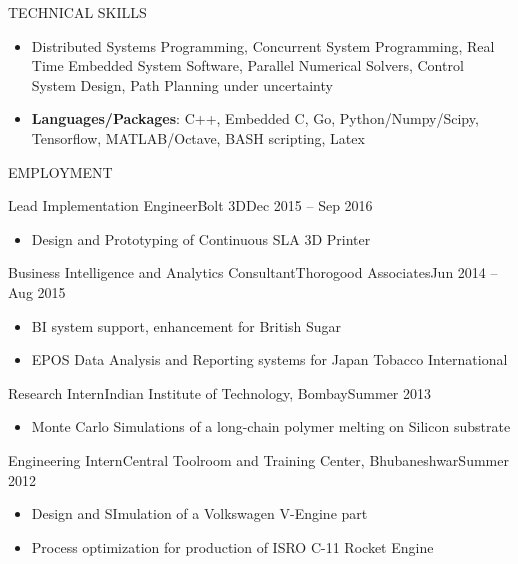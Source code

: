 \documentclass[]{mcdowellcv}
\begin{document}
\makeheader

\begin{cvsection}{TECHNICAL SKILLS}
	\begin{cvsubsection}{}{}{}
		\begin{itemize}
			\item Distributed Systems Programming, Concurrent System Programming, Real Time Embedded System Software, Parallel Numerical Solvers, Control System Design, Path Planning under uncertainty
			\item \textbf{Languages/Packages}:  C++, Embedded C, Go, Python/Numpy/Scipy, Tensorflow, MATLAB/Octave, BASH scripting, Latex
		\end{itemize}
	\end{cvsubsection}
\end{cvsection}

\begin{cvsection}{EMPLOYMENT}
	\begin{cvsubsection}{Lead Implementation Engineer}{Bolt 3D}{Dec 2015 -- Sep 2016}
		\begin{itemize}%
			\item Design and Prototyping of Continuous SLA 3D Printer
		\end{itemize}
	\end{cvsubsection}
	\begin{cvsubsection}{Business Intelligence and Analytics Consultant}{Thorogood Associates}{Jun 2014 -- Aug 2015}
		
		\begin{itemize}%
			\item BI system support, enhancement for British Sugar
            \item EPOS Data Analysis and Reporting systems for Japan Tobacco International
		\end{itemize}
	\end{cvsubsection}
    \begin{cvsubsection}{Research Intern}{Indian Institute of Technology, Bombay}{Summer 2013}
    	\begin{itemize}
        	\item Monte Carlo Simulations of a long-chain polymer melting on Silicon substrate
        \end{itemize}
    \end{cvsubsection}
    \begin{cvsubsection}{Engineering Intern}{Central Toolroom and Training Center, Bhubaneshwar}{Summer 2012}
    	\begin{itemize}
        	\item Design and SImulation of a Volkswagen V-Engine part
            \item Process optimization for production of ISRO C-11 Rocket Engine
        \end{itemize}
    \end{cvsubsection}
\end{cvsection}
\end{document}

